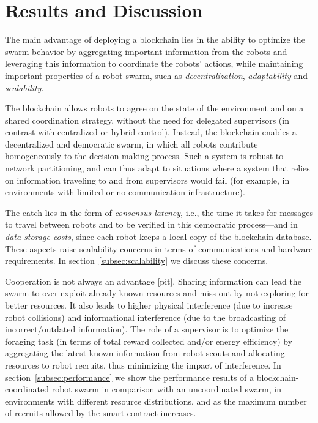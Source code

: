 \documentclass[runningheads]{llncs}
\begin{document}
\section{Results and Discussion}
\label{sec:results-and-discussion}

The main advantage of deploying a blockchain lies in the ability to optimize the swarm behavior by aggregating important information from the robots and leveraging this information to coordinate the robots' actions, while maintaining important properties of a robot swarm, such as \emph{decentralization}, \emph{adaptability} and \emph{scalability}.

The blockchain allows robots to agree on the state of the environment and on a shared coordination strategy, without the need for delegated supervisors (in contrast with centralized or hybrid control). Instead, the blockchain enables a decentralized and democratic swarm, in which all robots contribute homogeneously to the decision-making process. Such a system is robust to network partitioning, and can thus adapt to situations where a system that relies on information traveling to and from supervisors would fail (for example, in environments with limited or no communication infrastructure). 

The catch lies in the form of \emph{consensus latency}, i.e., the time it takes for messages to travel between robots and to be verified in this democratic process---and in \emph{data storage costs}, since each robot keeps a local copy of the blockchain database. These aspects raise scalability concerns in terms of communications and hardware requirements. In section~\ref{subsec:scalability} we discuss these concerns.

Cooperation is not always an advantage [pit]. Sharing information can lead the swarm to over-exploit already known resources and miss out by not exploring for better resources. It also leads to higher physical interference (due to increase robot collisions) and informational interference (due to the broadcasting of incorrect/outdated information). The role of a supervisor is to optimize the foraging task (in terms of total reward collected and/or energy efficiency) by aggregating the latest known information from robot scouts and allocating resources to robot recruits, thus minimizing the impact of interference. In section~\ref{subsec:performance} we show the performance results of a blockchain-coordinated robot swarm in comparison with an uncoordinated swarm, in environments with different resource distributions, and as the maximum number of recruits allowed by the smart contract increases.
\end{document}
